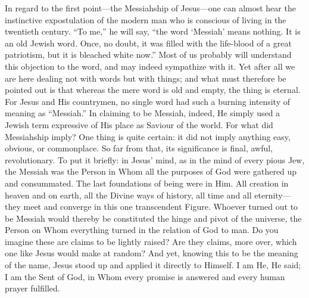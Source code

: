 \documentclass[12pt,a5paper,oneside]{book}
\begin{document}
In regard to the first point---the Messiahship
of Jesus---one can almost hear the instinctive expostulation 
of the modern man who is conscious
of living in the twentieth century. ``To me,'' he
will say, ``the word `Messiah' means nothing.
It is an old Jewish word. Once, no doubt, it was
filled with the life-blood of a great patriotism,
but it is bleached white now.'' Most of us probably 
will understand this objection to the word,
and may indeed sympathize with it. Yet
after all we are here dealing not with words
but with things; and what must therefore be
pointed out is that whereas the mere word is old
and empty, the thing is eternal. For Jesus and
His countrymen, no single word had such a
burning intensity of meaning as ``Messiah.''
In claiming to be Messiah, indeed, He simply
used a Jewish term expressive of His place as
Saviour of the world. For what did Messiahship
imply? One thing is quite certain: it
did not imply anything easy, obvious, or
commonplace. So far from that, its significance
is final, awful, revolutionary. To put it briefly:
in Jesus' mind, as in the mind of every pious
Jew, the Messiah was the Person in Whom all
the purposes of God were gathered up and
consummated. The last foundations of being
were in Him. All creation in heaven and on
earth, all the Divine ways of history, all time
and all eternity---they meet and converge in
this one transcendent Figure. Whoever turned
out to be Messiah would thereby be constituted
the hinge and pivot of the universe, the Person
on Whom everything turned in the relation of
God to man. Do you imagine these are claims
to be lightly raised? Are they claims, more
over, which one like Jesus would make at
random? And yet, knowing this to be the
meaning of the name, Jesus stood up and applied
it directly to Himself. I am He, He said; I
am the Sent of God, in Whom every promise
is answered and every human prayer fulfilled.
\end{document}
